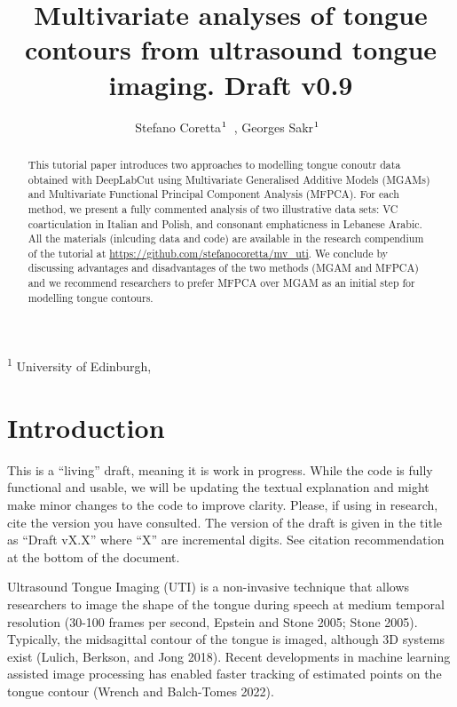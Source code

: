 \documentclass[
]{interact}
\title{Multivariate analyses of tongue contours from ultrasound tongue
imaging. Draft v0.9}
\author{Stefano
Coretta$\textsuperscript{1}$~\orcidlink{0000-0001-9627-5532}, Georges
Sakr$\textsuperscript{1}$~\orcidlink{0000-0003-3813-2669}}
\begin{document}
\captionsetup{labelsep=space}
\maketitle
\textsuperscript{1}  University of Edinburgh,  
\begin{abstract}
This tutorial paper introduces two approaches to modelling tongue
conoutr data obtained with DeepLabCut using Multivariate Generalised
Additive Models (MGAMs) and Multivariate Functional Principal Component
Analysis (MFPCA). For each method, we present a fully commented analysis
of two illustrative data sets: VC coarticulation in Italian and Polish,
and consonant emphaticness in Lebanese Arabic. All the materials
(inlcuding data and code) are available in the research compendium of
the tutorial at \url{https://github.com/stefanocoretta/mv_uti}. We
conclude by discussing advantages and disadvantages of the two methods
(MGAM and MFPCA) and we recommend researchers to prefer MFPCA over MGAM
as an initial step for modelling tongue contours.
\end{abstract}


\section{Introduction}\label{introduction}

\begin{tcolorbox}[enhanced jigsaw, left=2mm, toprule=.15mm, colback=white, opacityback=0, rightrule=.15mm, breakable, title=\textcolor{quarto-callout-warning-color}{\faExclamationTriangle}\hspace{0.5em}{Warning}, colbacktitle=quarto-callout-warning-color!10!white, bottomrule=.15mm, opacitybacktitle=0.6, colframe=quarto-callout-warning-color-frame, arc=.35mm, bottomtitle=1mm, toptitle=1mm, titlerule=0mm, leftrule=.75mm, coltitle=black]

This is a ``living'' draft, meaning it is work in progress. While the
code is fully functional and usable, we will be updating the textual
explanation and might make minor changes to the code to improve clarity.
Please, if using in research, cite the version you have consulted. The
version of the draft is given in the title as ``Draft vX.X'' where ``X''
are incremental digits. See citation recommendation at the bottom of the
document.

\end{tcolorbox}

Ultrasound Tongue Imaging (UTI) is a non-invasive technique that allows
researchers to image the shape of the tongue during speech at medium
temporal resolution (30-100 frames per second, Epstein and Stone 2005;
Stone 2005). Typically, the midsagittal contour of the tongue is imaged,
although 3D systems exist (Lulich, Berkson, and Jong 2018). Recent
developments in machine learning assisted image processing has enabled
faster tracking of estimated points on the tongue contour (Wrench and
Balch-Tomes 2022).
\end{document}
